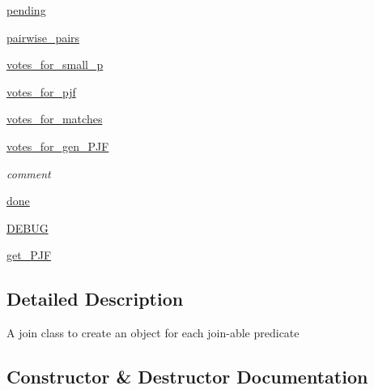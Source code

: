 \begin{DoxyCompactItemize}
\item 
\hyperlink{classdynamicfilterapp_1_1models_1_1_join_a2c37cdb35688296b995164b1b0142240}{pending}
\item 
\hyperlink{classdynamicfilterapp_1_1models_1_1_join_ae4cce95db1dcc5f19be6454337d96841}{pairwise\+\_\+pairs}
\item 
\hyperlink{classdynamicfilterapp_1_1models_1_1_join_a91816c1a011f3dfb47698f5313575446}{votes\+\_\+for\+\_\+small\+\_\+p}
\item 
\hyperlink{classdynamicfilterapp_1_1models_1_1_join_a54728e18d83bf4fb8232f87482dacd65}{votes\+\_\+for\+\_\+pjf}
\item 
\hyperlink{classdynamicfilterapp_1_1models_1_1_join_a37ebe7382290ac568bf48292decfecd4}{votes\+\_\+for\+\_\+matches}
\item 
\hyperlink{classdynamicfilterapp_1_1models_1_1_join_ad71de0d05082c97b065e5b6680d9bb9f}{votes\+\_\+for\+\_\+gen\+\_\+\+P\+JF}
\begin{DoxyCompactList}\small\item\em comment \end{DoxyCompactList}\item 
\hyperlink{classdynamicfilterapp_1_1models_1_1_join_ad604cff3eb5d475cdc9f8eb5ab570fee}{done}
\item 
\hyperlink{classdynamicfilterapp_1_1models_1_1_join_a73585d7121de037cf2e2ca12b27eb83e}{D\+E\+B\+UG}
\item 
\hyperlink{classdynamicfilterapp_1_1models_1_1_join_a30fc551c8a3a3bd30563a9464754246b}{get\+\_\+\+P\+JF}
\end{DoxyCompactItemize}


\subsection{Detailed Description}
\begin{DoxyVerb}A join class to create an object for each join-able predicate \end{DoxyVerb}
 

\subsection{Constructor \& Destructor Documentation}
\mbox{\label{classdynamicfilterapp_1_1models_1_1_join_a7564097a16dcabdffeaa80d067a31af1}} 
